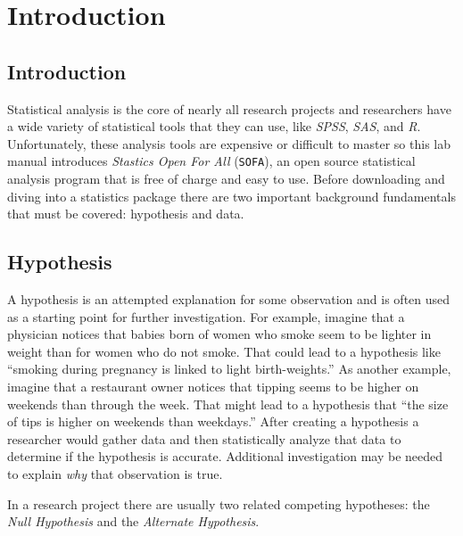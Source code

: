 \chapter{Introduction}\label{int:introduction}

\section{Introduction}


Statistical analysis is the core of nearly all research projects and researchers have a wide variety of statistical tools that they can use, like \textit{SPSS}, \textit{SAS}, and \textit{R}. Unfortunately, these analysis tools are expensive or difficult to master so this lab manual introduces \textit{Stastics Open For All} (\texttt{SOFA}), an open source statistical analysis program that is free of charge and easy to use. Before downloading and diving into a statistics package there are two important background fundamentals that must be covered: hypothesis and data.

\section{Hypothesis}\label{intro:Hypothesis}

A hypothesis is an attempted explanation for some observation and is often used as a starting point for further investigation. For example, imagine that a physician notices that babies born of women who smoke seem to be lighter in weight than for women who do not smoke. That could lead to a hypothesis like ``smoking during pregnancy is linked to light birth-weights.'' As another example, imagine that a restaurant owner notices that tipping seems to be higher on weekends than through the week. That might lead to a hypothesis that ``the size of tips is higher on weekends than weekdays.'' After creating a hypothesis a researcher would gather data and then statistically analyze that data to determine if the hypothesis is accurate. Additional investigation may be needed to explain \textit{why} that observation is true.

In a research project there are usually two related competing hypotheses: the \textit{Null Hypothesis} and the \textit{Alternate Hypothesis}. 

